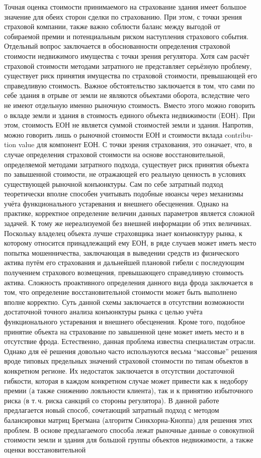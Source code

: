 \documentclass[12pt]{scrartcl}
\begin{document}
Точная оценка стоимости принимаемого на страхование здания имеет большое значение для обеих сторон сделки по страхованию. При этом, с точки зрения страховой компании, также важно соблюсти баланс между выгодой от собираемой премии и потенциальным риском наступления страхового события. Отдельный вопрос заключается в обоснованности определения страховой стоимости недвижимого имущества с точки зрения регулятора. Хотя сам расчёт страховой стоимости методами затратного не представляет серьёзную проблему, существует риск принятия имущества по страховой стоимости, превышающей его справедливую стоимость. Важное обстоятельство заключается в том, что сами по себе здания в отрыве от земли не являются объектами оборота, вследствие чего не имеют отдельную именно рыночную стоимость. Вместо этого можно говорить о вкладе земли и здания в стоимость единого объекта недвижимости (ЕОН). При этом, стоимость ЕОН не является суммой стоимостей земли и здания. Напротив, можно говорить лишь о рыночной стоимости ЕОН и стоимости вклада {\foreignlanguage{english}{contribution value}} для компонент ЕОН. С точки зрения страхования, это означает, что, в случае определения страховой стоимости на основе восстановительной, определяемой методами затратного подхода, существует риск принятия объекта по завышенной стоимости, не отражающей его реальную ценность в условиях существующей рыночной конъюнктуры. Сам по себе затратный подход теоретически вполне способен учитывать подобные нюансы через механизмы учёта функционального устаревания и внешнего обесценения. Однако на практике, корректное определение величин данных параметров является сложной задачей. К тому же нереализуемой без внешней информации об этих величинах. Поскольку владелец объекта лучше страховщика знает конъюнктуру рынка, к которому относится принадлежащий ему ЕОН, в ряде случаев может иметь место попытка мошенничества, заключающая в выведении средств из физического актива путём его страхования и дальнейшей плановой гибели с последующим получением страхового возмещения, превышающего справедливую стоимость актива. Сложность проактивного определения данного вида фрода заключается в том, что определение восстановительной стоимости может быть выполнено вполне корректно. Суть данной схемы заключается в отсутствии возможности достаточной точного анализа конъюнктуры рынка с целью учёта функционального устаревания и внешнего обесценения. Кроме того, подобное принятие объекта на страхование по завышенной цене может иметь место и в отсутствие фрода. Естественно, данная проблема известна специалистам отрасли. Однако для её решения довольно часто используются весьма ``массовые'' решения вроде типовых предельных значений страховой стоимости по типам объектов в конкретном регионе. Их недостаток заключается в отсутствии достаточной гибкости, которая в каждом конкретном случае может привести как к недобору премии (а также снижению лояльности клиента), так и к принятию избыточного риска (в т.\,ч. риска санкций со стороны регулятора). В данной работе предлагается новый способ, сочетающий затратный подход с методом балансировки матриц Брегмана (алгоритм Синкхорна-Кноппа) для решения этих проблем. В основе предлагаемого способа лежат рыночные данные о совокупной стоимости земли и здания для большой группы объектов недвижимости, а также оценки восстановительной 
\end{document}
